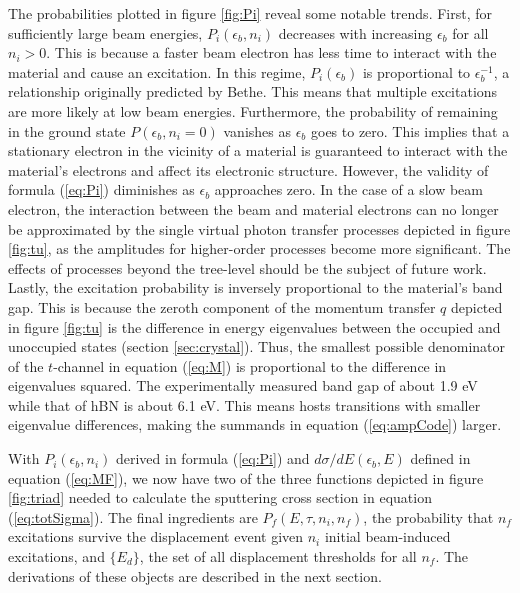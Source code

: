 \documentclass[twoside,twocolumn,9pt]{article}
\begin{document}
The probabilities plotted in figure \ref{fig:Pi} reveal some notable
trends.
First, for sufficiently large beam energies, $P_i(\epsilon_b, n_i)$ decreases
with increasing $\epsilon_b$ for all $n_i>0$.
This is because a faster beam electron has less time to interact with the
material and cause an excitation.
In this regime, $P_i(\epsilon_b)$ is proportional to $\epsilon_b^{-1}$, a
relationship originally predicted by Bethe.\cite{Bethe1930, Inokuti1967,
Kretschmer2020}
This means that multiple excitations are more likely at low beam energies.
Furthermore, the probability of remaining in the ground state $P(\epsilon_b,
n_i=0)$ vanishes as $\epsilon_b$ goes to zero.
This implies that a stationary electron in the vicinity of a material is
guaranteed to interact with the material's electrons and affect its electronic
structure.
However, the validity of formula (\ref{eq:Pi}) diminishes as $\epsilon_b$
approaches zero.
In the case of a slow beam electron, the interaction between the beam and
material electrons can no longer be approximated by the single virtual photon
transfer processes depicted in figure \ref{fig:tu}, as the amplitudes for
higher-order processes become more significant.
The effects of processes beyond the tree-level should be the subject of future
work.
Lastly, the excitation probability is inversely proportional to the material's
band gap.
This is because the zeroth component of the momentum transfer $q$ depicted in
figure \ref{fig:tu} is the difference in energy eigenvalues between the
occupied and unoccupied states (section \ref{sec:crystal}).
Thus, the smallest possible denominator of the $t$-channel in equation
(\ref{eq:M}) is proportional to the difference in eigenvalues squared.
The experimentally measured band gap of  about 1.9 eV \cite{Gusakova2017}
while that of hBN is about 6.1 eV.\cite{Elias2019}
This means  hosts transitions with smaller eigenvalue differences,
making the summands in equation (\ref{eq:ampCode}) larger.

With $P_i(\epsilon_b, n_i)$ derived in formula (\ref{eq:Pi}) and
$d\sigma/dE(\epsilon_b, E)$ defined in equation (\ref{eq:MF}), we now have two
of the three functions depicted in figure \ref{fig:triad} needed to calculate
the sputtering cross section in equation (\ref{eq:totSigma}).
The final ingredients are $P_f(E, \tau, n_i, n_f)$, the probability that $n_f$
excitations survive the displacement event given $n_i$ initial beam-induced
excitations, and $\{E_d\}$, the set of all displacement thresholds for all
$n_f$.
The derivations of these objects are described in the next section.
\end{document}
